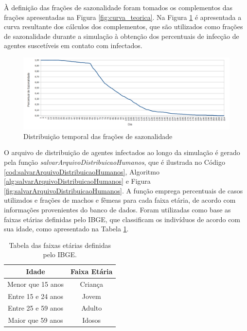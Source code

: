 À definição das frações de sazonalidade foram tomados os complementos das frações apresentadas na Figura \ref{fig:curva_teorica}. Na Figura \ref{fig:percentuais_sazonalidade} é apresentada a curva resultante dos cálculos dos complementos, que são utilizados como frações de sazonalidade durante a simulação à obtenção dos percentuais de infecção de agentes suscetíveis em contato com infectados. 

\begin{figure}[H]
  \centering
  \includegraphics[width=1\textwidth]{Figuras/TratamentosDados/Sazonalidade.png}
  \caption{Distribuição temporal das frações de sazonalidade}
  \label{fig:percentuais_sazonalidade}
\end{figure} 

O arquivo de distribuição de agentes infectados ao longo da simulação é gerado pela função \textit{salvarArquivoDistribuicaoHumanos}, que é ilustrada no Código \ref{cod:salvarArquivoDistribuicaoHumanos}, Algoritmo \ref{alg:salvarArquivoDistribuicaoHumanos} e Figura \ref{fig:salvarArquivoDistribuicaoHumanos}. A função emprega percentuais de casos utilizados e frações de machos e fêmeas para cada faixa etária, de acordo com informações provenientes do banco de dados. Foram utilizadas como base as faixas etárias definidas pelo IBGE, que classificam os indivíduos de acordo com sua idade, como apresentado na Tabela \ref{tab:faixasEtariasIBGE}.  

\begin{table}[H]
\centering
\begin{tabular}{c|c}
 \textbf{Idade} 	& \textbf{Faixa Etária}	\\ \hline
 Menor que 15 anos 	& Criança		\\
 Entre 15 e 24 anos 	& Jovem			\\
 Entre 25 e 59 anos 	& Adulto		\\
 Maior que 59 anos 	& Idosos		\\
\end{tabular}
\caption{Tabela das faixas etárias definidas pelo IBGE.}
\label{tab:faixasEtariasIBGE}
\end{table}

